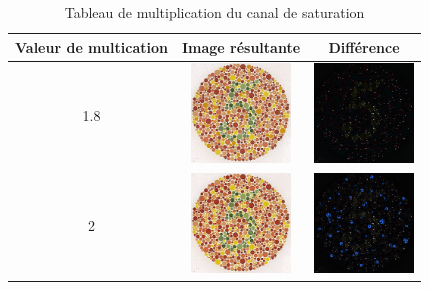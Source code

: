 \documentclass[a4paper,11pt]{article}
\begin{document}
\begin{table}[H]
  \begin{center}
  
    \begin{tabular}{|c|c|c|}
    
      \hline
    
      \bf Valeur de multication &
      \bf Image résultante &
      \bf Différence \\
      
      \hline
      \hline
      
      1.8 & 
      \includegraphics[width=100px]{images/it3_result_1-8.png} &
      \includegraphics[width=100px]{images/it3_diff_1-8.png}  \\
      
      \hline
      
      2 &
      \includegraphics[width=100px]{images/it3_result_2.png} &
      \includegraphics[width=100px]{images/it3_diff_2.png}  \\
      
      \hline
    \end{tabular}
    
    \caption{Tableau de multiplication du canal de saturation}
    \label{tab:}
    
  \end{center}
\end{table}
\end{document}
